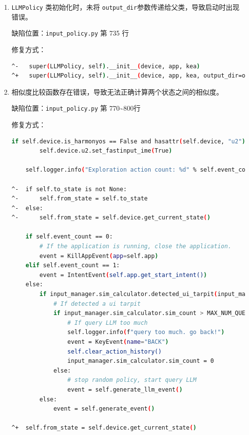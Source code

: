 \documentclass{article}
\begin{document}
\begin{enumerate}
    \item \texttt{LLMPolicy} 类初始化时，未将 \texttt{output\_dir}参数传递给父类，导致启动时出现错误。
    
    缺陷位置：\texttt{input\_policy.py} 第 735 行

    修复方式：

    \begin{lstlisting}[language=bash,numbers=none]
^-   super(LLMPolicy, self).__init__(device, app, kea)
^+   super(LLMPolicy, self).__init__(device, app, kea, output_dir=output_dir)
    \end{lstlisting}

    \item 相似度比较函数存在错误，导致无法正确计算两个状态之间的相似度。
    
    缺陷位置：\texttt{input\_policy.py} 第 770\textasciitilde 800行
    
    修复方式：

    \begin{lstlisting}[language=bash,numbers=none]
    if self.device.is_harmonyos == False and hasattr(self.device, "u2"):
        self.device.u2.set_fastinput_ime(True)

    self.logger.info("Exploration action count: %d" % self.event_count)

^-  if self.to_state is not None:
^-      self.from_state = self.to_state
^-  else:
^-      self.from_state = self.device.get_current_state()

    if self.event_count == 0:
        # If the application is running, close the application.
        event = KillAppEvent(app=self.app)
    elif self.event_count == 1:
        event = IntentEvent(self.app.get_start_intent())
    else:
        if input_manager.sim_calculator.detected_ui_tarpit(input_manager):
            # If detected a ui tarpit
            if input_manager.sim_calculator.sim_count > MAX_NUM_QUERY_LLM:
                # If query LLM too much
                self.logger.info(f"query too much. go back!")
                event = KeyEvent(name="BACK")
                self.clear_action_history()
                input_manager.sim_calculator.sim_count = 0
            else:
                # stop random policy, start query LLM
                event = self.generate_llm_event()
        else:
            event = self.generate_event()

^+  self.from_state = self.device.get_current_state()
    \end{lstlisting}
\end{enumerate}
\end{document}

